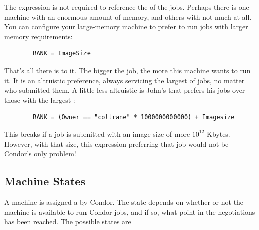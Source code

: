 The  expression is not required to reference the
 of the jobs.
Perhaps there is one machine with an enormous amount of memory,
and others with not much at all.
You can configure your
large-memory machine to prefer to run jobs with larger memory
requirements:
\begin{verbatim}
        RANK = ImageSize
\end{verbatim}

That's all there is to it.
The bigger the job, the more this machine
wants to run it.
It is an altruistic preference, always servicing
the largest of jobs, no matter who submitted them.
A little less altruistic is John's  that
prefers his jobs over those with the largest
:
\begin{verbatim}
        RANK = (Owner == "coltrane" * 1000000000000) + Imagesize
\end{verbatim}
This  breaks if a job is submitted with an image
size of more $10^{12}$ Kbytes.
However, with that size, this  expression
preferring that job would not be Condor's
only problem! 

\subsection{\label{sec:States}
Machine States}

A machine is assigned a  by Condor.
The state
depends on whether or not the machine is available to run Condor
jobs, and if so, what point in the negotiations has been reached.
The possible states are


